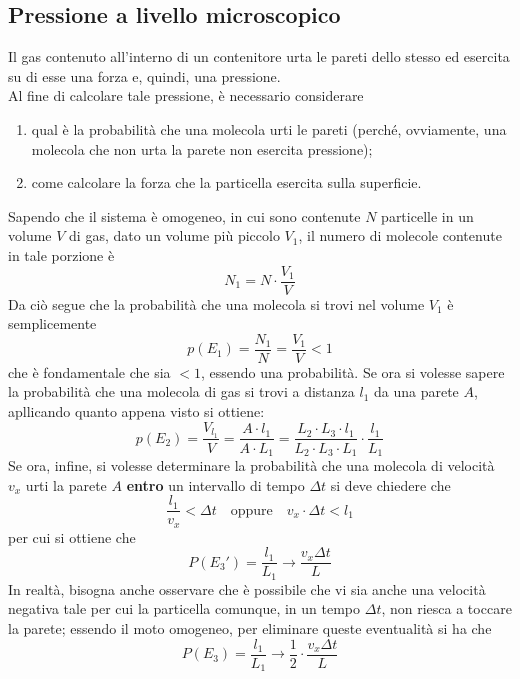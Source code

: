 \documentclass[a4paper]{extarticle}
\begin{document}
\subsection{Pressione a livello microscopico}
Il gas contenuto all'interno di un contenitore urta le pareti dello stesso ed esercita su di esse una forza e, quindi, una pressione.\\
Al fine di calcolare tale pressione, è necessario considerare
\begin{enumerate}
  \item qual è la probabilità che una molecola urti le pareti (perché, ovviamente, una molecola che non urta la parete non esercita pressione);
  \item come calcolare la forza che la particella esercita sulla superficie.
\end{enumerate}
Sapendo che il sistema è omogeneo, in cui sono contenute $N$ particelle in un volume $V$ di gas, dato un volume più piccolo $V_1$, il numero di molecole contenute in tale porzione è
\[N_1 = N \cdot \frac{V_1}{V}\]
Da ciò segue che la probabilità che una molecola si trovi nel volume $V_1$ è semplicemente
\[p(E_1) = \frac{N_1}{N} = \frac{V_1}{V} < 1\]
che è fondamentale che sia $< 1$, essendo una probabilità. Se ora si volesse sapere la probabilità che una molecola di gas si trovi a distanza $l_1$ da una parete $A$, apllicando quanto appena visto si ottiene:
\[p(E_2) = \frac{V_{l_1}}{V} = \frac{A \cdot l_1}{A \cdot L_1} = \frac{L_2 \cdot L_3 \cdot l_1}{L_2 \cdot L_3 \cdot L_1} \cdot \frac{l_1}{L_1}\]
Se ora, infine, si volesse determinare la probabilità che una molecola di velocità $v_x$ urti la parete $A$ \textbf{entro} un intervallo di tempo $\Delta t$ si deve chiedere che
\[\frac{l_1}{v_x} < \Delta t \hspace{1em} \text{oppure} \hspace{1em} v_x \cdot \Delta t < l_1\]
per cui si ottiene che
\[P(E_3') = \frac{l_1}{L_1} \longrightarrow \frac{v_x \Delta t}{L}\]
In realtà, bisogna anche osservare che è possibile che vi sia anche una velocità negativa tale per cui la particella comunque, in un tempo $\Delta t$, non riesca a toccare la parete; essendo il moto omogeneo, per eliminare queste eventualità si ha che
\[P(E_3) = \frac{l_1}{L_1} \longrightarrow \frac{1}{2} \cdot \frac{v_x \Delta t}{L}\]
\end{document}
